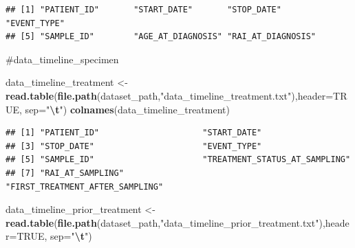 \documentclass[
]{article}
\newenvironment{Shaded}{\begin{snugshade}}{\end{snugshade}}
\newcommand{\AttributeTok}[1]{\textcolor[rgb]{0.13,0.29,0.53}{#1}}
\newcommand{\ConstantTok}[1]{\textcolor[rgb]{0.56,0.35,0.01}{#1}}
\newcommand{\FunctionTok}[1]{\textcolor[rgb]{0.13,0.29,0.53}{\textbf{#1}}}
\newcommand{\NormalTok}[1]{#1}
\newcommand{\OtherTok}[1]{\textcolor[rgb]{0.56,0.35,0.01}{#1}}
\newcommand{\SpecialCharTok}[1]{\textcolor[rgb]{0.81,0.36,0.00}{\textbf{#1}}}
\newcommand{\StringTok}[1]{\textcolor[rgb]{0.31,0.60,0.02}{#1}}
\begin{document}
\begin{verbatim}
## [1] "PATIENT_ID"       "START_DATE"       "STOP_DATE"        "EVENT_TYPE"      
## [5] "SAMPLE_ID"        "AGE_AT_DIAGNOSIS" "RAI_AT_DIAGNOSIS"
\end{verbatim}

\#data\_timeline\_specimen

\begin{Shaded}
\begin{Highlighting}[]
\NormalTok{data\_timeline\_treatment  }\OtherTok{\textless{}{-}} \FunctionTok{read.table}\NormalTok{(}\FunctionTok{file.path}\NormalTok{(dataset\_path,}\StringTok{"data\_timeline\_treatment.txt"}\NormalTok{),}\AttributeTok{header=}\ConstantTok{TRUE}\NormalTok{, }\AttributeTok{sep=}\StringTok{"}\SpecialCharTok{\textbackslash{}t}\StringTok{"}\NormalTok{) }
\FunctionTok{colnames}\NormalTok{(data\_timeline\_treatment)}
\end{Highlighting}
\end{Shaded}

\begin{verbatim}
## [1] "PATIENT_ID"                     "START_DATE"                    
## [3] "STOP_DATE"                      "EVENT_TYPE"                    
## [5] "SAMPLE_ID"                      "TREATMENT_STATUS_AT_SAMPLING"  
## [7] "RAI_AT_SAMPLING"                "FIRST_TREATMENT_AFTER_SAMPLING"
\end{verbatim}

\begin{Shaded}
\begin{Highlighting}[]
\NormalTok{data\_timeline\_prior\_treatment  }\OtherTok{\textless{}{-}} \FunctionTok{read.table}\NormalTok{(}\FunctionTok{file.path}\NormalTok{(dataset\_path,}\StringTok{"data\_timeline\_prior\_treatment.txt"}\NormalTok{),}\AttributeTok{header=}\ConstantTok{TRUE}\NormalTok{, }\AttributeTok{sep=}\StringTok{"}\SpecialCharTok{\textbackslash{}t}\StringTok{"}\NormalTok{)           }
\end{Highlighting}
\end{Shaded}
\end{document}
